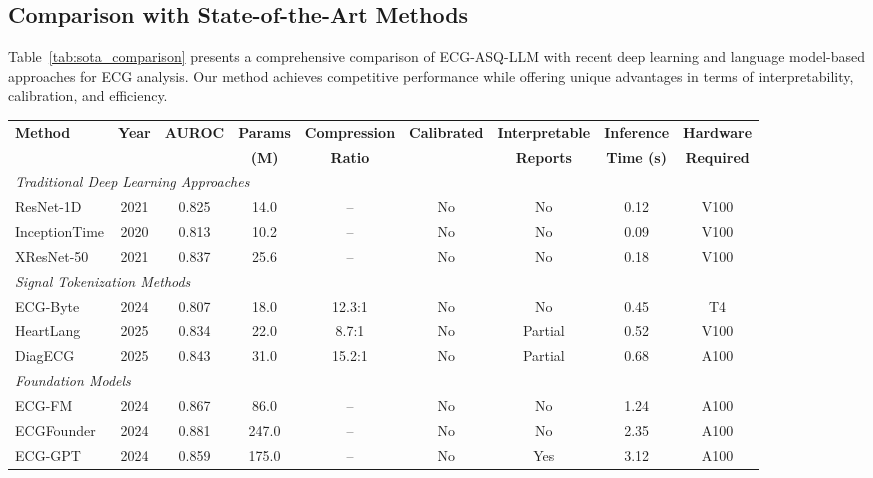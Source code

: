 \documentclass[journal]{IEEEtran}
\begin{document}
\subsection{Comparison with State-of-the-Art Methods}

Table~\ref{tab:sota_comparison} presents a comprehensive comparison of ECG-ASQ-LLM with recent deep learning and language model-based approaches for ECG analysis. Our method achieves competitive performance while offering unique advantages in terms of interpretability, calibration, and efficiency.

\begin{table*}[!t]
\centering
\caption{Comprehensive Comparison with State-of-the-Art ECG Analysis Methods on PTB-XL Dataset}
\label{tab:sota_comparison}
\begin{tabular}{lcccccccc}
\toprule
\textbf{Method} & \textbf{Year} & \textbf{AUROC} & \textbf{Params} & \textbf{Compression} & \textbf{Calibrated} & \textbf{Interpretable} & \textbf{Inference} & \textbf{Hardware} \\
 & & & \textbf{(M)} & \textbf{Ratio} & & \textbf{Reports} & \textbf{Time (s)} & \textbf{Required} \\
\midrule
\multicolumn{9}{l}{\textit{Traditional Deep Learning Approaches}} \\
ResNet-1D~\cite{Strodthoff2021} & 2021 & 0.825 & 14.0 & -- & No & No & 0.12 & V100 \\
InceptionTime & 2020 & 0.813 & 10.2 & -- & No & No & 0.09 & V100 \\
XResNet-50 & 2021 & 0.837 & 25.6 & -- & No & No & 0.18 & V100 \\
\midrule
\multicolumn{9}{l}{\textit{Signal Tokenization Methods}} \\
ECG-Byte~\cite{Wang2024ECGByte} & 2024 & 0.807 & 18.0 & 12.3:1 & No & No & 0.45 & T4 \\
HeartLang~\cite{Li2025} & 2025 & 0.834 & 22.0 & 8.7:1 & No & Partial & 0.52 & V100 \\
DiagECG~\cite{Zhang2025} & 2025 & 0.843 & 31.0 & 15.2:1 & No & Partial & 0.68 & A100 \\
\midrule
\multicolumn{9}{l}{\textit{Foundation Models}} \\
ECG-FM~\cite{Park2024} & 2024 & 0.867 & 86.0 & -- & No & No & 1.24 & A100 \\
ECGFounder~\cite{Wang2024ECGFounder} & 2024 & 0.881 & 247.0 & -- & No & No & 2.35 & A100 \\
ECG-GPT~\cite{Smith2024} & 2024 & 0.859 & 175.0 & -- & No & Yes & 3.12 & A100 \\

\end{tabular}
\end{table*}
\end{document}
